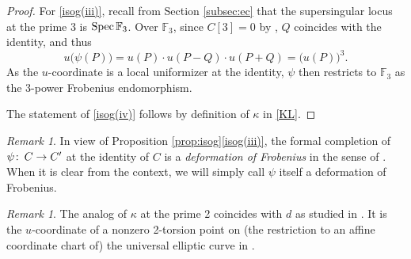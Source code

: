 \documentclass{gtpart}
\theoremstyle{definition}
\theoremstyle{remark}
\newtheorem{rmk}[thm]{Remark}
\def\co{\colon\thinspace}
\newcommand{\mb}[1]{\mathbb{#1}}
\newcommand{\Spec}{{\rm Spec\thinspace}}
\newcommand{\BF}{{\mb F}}
\newcommand{\K}{\kappa}
\newcommand{\isog}[1]{Proposition \ref{prop:isog}\thinspace \eqref{isog(#1)}}
\begin{document}
\begin{proof}
 For \eqref{isog(iii)}, recall from Section \ref{subsec:ec} that the supersingular locus at the prime 3 is $\Spec \BF_3$.  
 Over $\BF_3$, since $C[3] = 0$ by \cite[V.3.1a]{AEC}, $Q$ coincides with the identity, and thus 
 \[
  u\big( \psi(P) \big) = u(P) \cdot u(P-Q) \cdot u(P+Q) = \big( u(P) \big)^3.  
 \]
 As the $u$-coordinate is a local uniformizer at the identity, $\psi$ then restricts to $\BF_3$ as the 3-power Frobenius endomorphism.  

 The statement of \eqref{isog(iv)} follows by definition of $\K$ in \eqref{KL}.  
\end{proof}

\begin{rmk}
 In view of \isog{iii}, the formal completion of $\psi \co C \to C'$ at the identity of $C$ 
 is a {\em deformation of Frobenius} in the sense of \cite[11.3]{cong}.  
 When it is clear from the context, we will simply call $\psi$ itself a deformation of Frobenius.  
\end{rmk}

\begin{rmk}
\label{rmk:K}
 The analog of $\K$ at the prime 2 coincides with $d$ as studied in \cite[Section 3]{h2p2}.  
 It is the $u$-coordinate of a nonzero 2-torsion point on 
 (the restriction to an affine coordinate chart of) the universal elliptic curve in \cite[Proposition 3.2]{tmf3}.  
\end{rmk}
\end{document}
